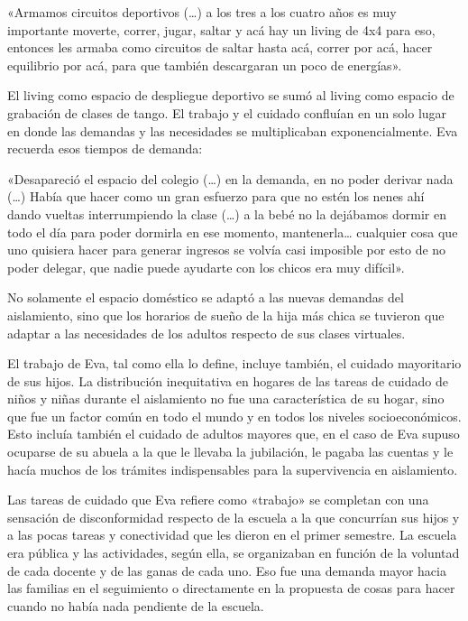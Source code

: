 \begin{refsection}
\begin{gbcita}
«Armamos circuitos deportivos (…) a los tres a los cuatro años es muy importante moverte, correr, jugar, saltar y acá hay un living de 4x4 para eso, entonces les armaba como circuitos de saltar hasta acá, correr por acá, hacer equilibrio por acá, para que también descargaran un poco de energías».

\end{gbcita}

El living como espacio de despliegue deportivo se sumó al living como espacio de grabación de clases de tango. El trabajo y el cuidado confluían en un solo lugar en donde las demandas y las necesidades se multiplicaban exponencialmente. Eva recuerda esos tiempos de demanda:


\begin{gbcita}
«Desapareció el espacio del colegio (…) en la demanda, en no poder derivar nada (…) Había que hacer como un gran esfuerzo para que no estén los nenes ahí dando vueltas interrumpiendo la clase (…) a la bebé no la dejábamos dormir en todo el día para poder dormirla en ese momento, mantenerla… cualquier cosa que uno quisiera hacer para generar ingresos se volvía casi imposible por esto de no poder delegar, que nadie puede ayudarte con los chicos era muy difícil».

\end{gbcita}

No solamente el espacio doméstico se adaptó a las nuevas demandas del aislamiento, sino que los horarios de sueño de la hija más chica se tuvieron que adaptar a las necesidades de los adultos respecto de sus clases virtuales.

El trabajo de Eva, tal como ella lo define, incluye también, el cuidado mayoritario de sus hijos. La distribución inequitativa en hogares de las tareas de cuidado de niños y niñas durante el aislamiento no fue una característica de su hogar, sino que fue un factor común en todo el mundo y en todos los niveles socioeconómicos. Esto incluía también el cuidado de adultos mayores que, en el caso de Eva supuso ocuparse de su abuela a la que le llevaba la jubilación, le pagaba las cuentas y le hacía muchos de los trámites indispensables para la supervivencia en aislamiento.

Las tareas de cuidado que Eva refiere como «trabajo» se completan con una sensación de disconformidad respecto de la escuela a la que concurrían sus hijos y a las pocas tareas y conectividad que les dieron en el primer semestre. La escuela era pública y las actividades, según ella, se organizaban en función de la voluntad de cada docente y de las ganas de cada uno. Eso fue una demanda mayor hacia las familias en el seguimiento o directamente en la propuesta de cosas para hacer cuando no había nada pendiente de la escuela.


\end{refsection}
